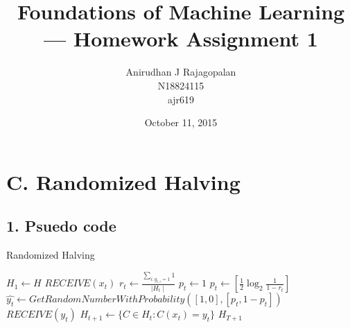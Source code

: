 \documentclass{article}
\begin{document}
\title{Foundations of Machine Learning --- Homework Assignment 1}
\date{October 11, 2015}
\author{Anirudhan J Rajagopalan\\ N18824115\\ ajr619}

\maketitle

\newpage

\section*{C. Randomized Halving}
\subsection*{1. Psuedo code}

\begin{algorithm}
  \caption{Randomized Halving}\label{euclid}
  \begin{algorithmic}[1]
    \State{} $ H_{1} \gets H$
    \State{} $RECEIVE(x_{t})$
    \State{} \( r_{t} \gets{} \frac{\sum_{i:y_{t,i} = 1} 1}{\mid H_{t} \mid}  \)
    \State{} \( p_{t} \gets{} 1 \)
    \State{} \( p_{t} \gets{} [\frac{1}{2} \log_2{\frac{1}{1- r_{t}}} ] \)
    \EndIf{}
    \State{} \( \hat{y_{t}} \gets{} GetRandomNumberWithProbability([1, 0], [p_{t}, 1-p_{t}]) \)
    \State{} $RECEIVE(y_{t})$
    \State{} \( H_{t+1}  \gets{} \{ C \in H_{t}: C(x_{t}) = y_{t} \}\)
    \EndIf{}
    \EndFor{}
    \Return{} $H_{T+1} $
  \end{algorithmic}
\end{algorithm}
\end{document}

